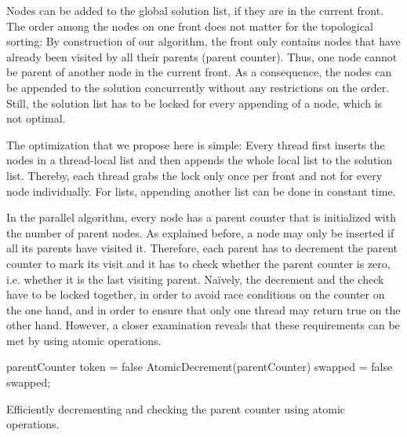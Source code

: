 Nodes can be added to the global solution list, if they are in the current front.
The order among the nodes on one front does not matter for the topological sorting:
By construction of our algorithm, the front only contains nodes that have already been visited by all their parents (parent counter). Thus, one node cannot be parent of another node in the current front.
As a consequence, the nodes can be appended to the solution concurrently without any restrictions on the order.
Still, the solution list has to be locked for every appending of a node, which is not optimal.

The optimization that we propose here is simple: Every thread first inserts the nodes in a thread-local list and then appends the whole local list to the solution list.
Thereby, each thread grabs the lock only once per front and not for every node individually.
For lists, appending another list can be done in constant time.

In the parallel algorithm, every node has a parent counter that is initialized with the number of parent nodes.
As explained before, a node may only be inserted if all its parents have visited it.
Therefore, each parent has to decrement the parent counter to mark its visit and it has to check whether the parent counter is zero, i.e. whether it is the last visiting parent.
Na{\"i}vely, the decrement and the check have to be locked together, in order to avoid race conditions on the counter on the one hand, and in order to ensure that only one thread may return true on the other hand. 
However, a closer examination reveals that these requirements can be met by using atomic operations.

\begin{listing}
  \KwInt parentCounter\;
  \KwBool token = false\;
   {
    AtomicDecrement(parentCounter)\;
    \KwBool swapped = false\;
    \KwRet swapped;
  }
 \caption{Efficiently decrementing and checking the parent counter using atomic operations.}
 \label{lst:parentCounter}
\end{listing}

